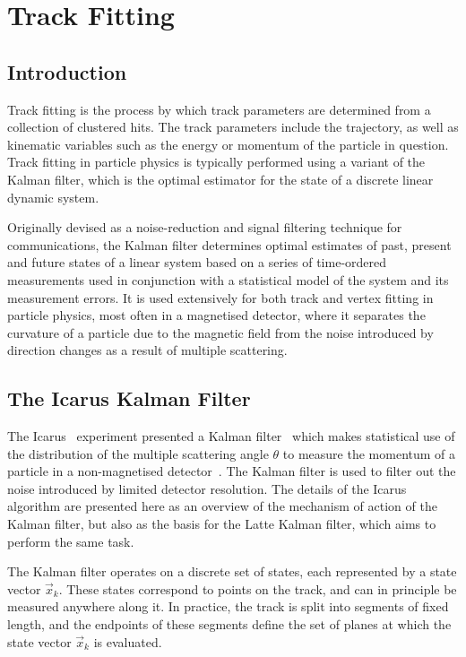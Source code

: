 \chapter{Track Fitting}\label{chapter:KalmanFilter}

\section{Introduction}
Track fitting is the process by which track parameters are determined from a collection of clustered hits. The track parameters include the trajectory, as well as kinematic variables such as the energy or momentum of the particle in question. Track fitting in particle physics is typically performed using a variant of the Kalman filter, which is the optimal estimator for the state of a discrete linear dynamic system.

Originally devised as a noise-reduction and signal filtering technique for communications, the Kalman filter determines optimal estimates of past, present and future states of a linear system based on a series of time-ordered measurements used in conjunction with a statistical model of the system and its measurement errors. It is used extensively for both track and vertex fitting in particle physics, most often in a magnetised detector, where it separates the curvature of a particle due to the magnetic field from the noise introduced by direction changes as a result of multiple scattering.

\section{The Icarus Kalman Filter}
The Icarus~\citep{Amerio2004} experiment presented a Kalman filter~\citep{Fruhwirth1987} which makes statistical use of the distribution of the multiple scattering angle $\theta$ to measure the momentum of a particle in a non-magnetised detector~\citep{Ankowski2006}. The Kalman filter is used to filter out the noise introduced by limited detector resolution. The details of the Icarus algorithm are presented here as an overview of the mechanism of action of the Kalman filter, but also as the basis for the Latte Kalman filter, which aims to perform the same task.

The Kalman filter operates on a discrete set of states, each represented by a state vector $\vec{x}_k$. These states correspond to points on the track, and can in principle be measured anywhere along it. In practice, the track is split into segments of fixed length, and the endpoints of these segments define the set of planes at which the state vector $\vec{x}_k$ is evaluated. 

